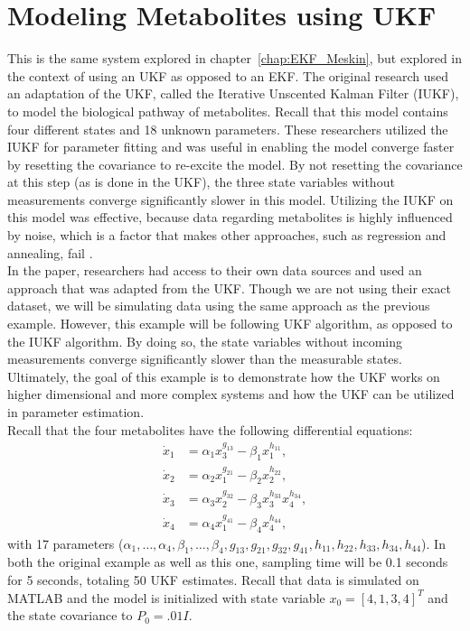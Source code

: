\section{Modeling Metabolites using UKF}
\label{Modeling Metabolites using UKF}




\noindent This is the same system explored in chapter~\ref{chap:EKF_Meskin}, but explored in the context of using an UKF as opposed to an EKF. The original research used an adaptation of the UKF, called the Iterative Unscented Kalman Filter (IUKF), to model the biological pathway of metabolites. Recall that this model contains four different states and 18 unknown parameters. These researchers utilized the IUKF for parameter fitting and was useful in enabling the model converge faster by resetting the covariance to re-excite the model. By not resetting the covariance at this step (as is done in the UKF), the three state variables without measurements converge significantly slower in this model. Utilizing the IUKF on this model was effective, because data regarding metabolites is highly influenced by noise, which is a factor that makes other approaches, such as regression and annealing, fail \cite{article5}. \\ 

\noindent In the paper, researchers had access to their own data sources and used an approach that was adapted from the UKF. Though we are not using their exact dataset, we will be simulating data using the same approach as the previous example. However, this example will be following UKF algorithm, as opposed to the IUKF algorithm. By doing so, the state variables without incoming measurements converge significantly slower than the measurable states. Ultimately, the goal of this example is to demonstrate how the UKF works on higher dimensional and more complex systems and how the UKF can be utilized in parameter estimation. \\

\noindent Recall that the four metabolites have the following differential equations:
\begin{align*}
\dot x_1 &= \alpha_1 x_3^{g_{13}} - \beta_1 x_1^{h_{11}}, \\
\dot x_2 &= \alpha_2 x_1^{g_{21}} - \beta_2 x_2^{h_{22}}, \\
\dot x_3 &= \alpha_3 x_2^{g_{32}} - \beta_3 x_3^{h_{33}} x_4^{h_{34}}, \\
\dot x_4 &= \alpha_4  x_1^{g_{41}} - \beta_4 x_4^{h_{44}},
\end{align*}
with 17 parameters ($\alpha_1, \hdots, \alpha_4, \beta_1, \hdots, \beta_4, g_{13}, g_{21}, g_{32}, g_{41}, h_{11}, h_{22}, h_{33}, h_{34},h_{44} $). In both the original example as well as this one, sampling time will be 0.1 seconds for 5 seconds, totaling 50 UKF estimates. Recall that data is simulated on MATLAB and the model is initialized with state variable $x_0 = [4, 1, 3, 4]^T$ and the state covariance to $P_0 = .01I$. \\


